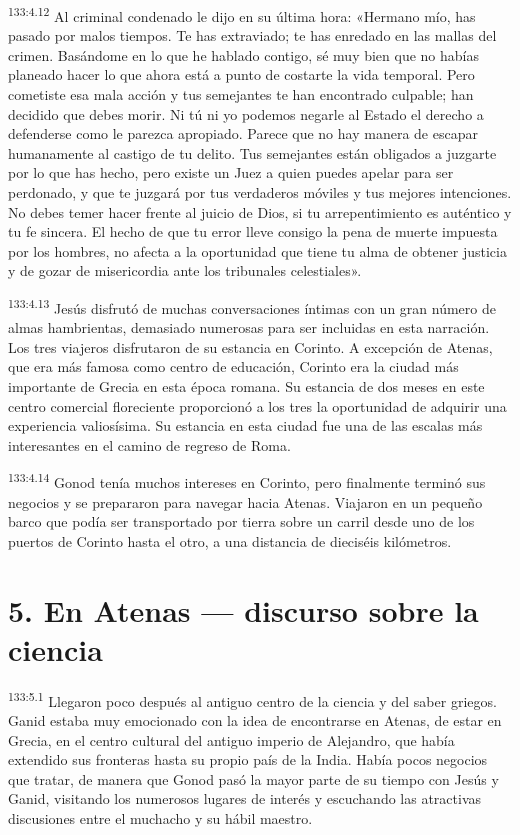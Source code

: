\par
\textsuperscript{133:4.12} Al criminal condenado le dijo en su última hora: «Hermano mío, has pasado por malos tiempos. Te has extraviado; te has enredado en las mallas del crimen. Basándome en lo que he hablado contigo, sé muy bien que no habías planeado hacer lo que ahora está a punto de costarte la vida temporal. Pero cometiste esa mala acción y tus semejantes te han encontrado culpable; han decidido que debes morir. Ni tú ni yo podemos negarle al Estado el derecho a defenderse como le parezca apropiado. Parece que no hay manera de escapar humanamente al castigo de tu delito. Tus semejantes están obligados a juzgarte por lo que has hecho, pero existe un Juez a quien puedes apelar para ser perdonado, y que te juzgará por tus verdaderos móviles y tus mejores intenciones. No debes temer hacer frente al juicio de Dios, si tu arrepentimiento es auténtico y tu fe sincera. El hecho de que tu error lleve consigo la pena de muerte impuesta por los hombres, no afecta a la oportunidad que tiene tu alma de obtener justicia y de gozar de misericordia ante los tribunales celestiales».

\par
\textsuperscript{133:4.13} Jesús disfrutó de muchas conversaciones íntimas con un gran número de almas hambrientas, demasiado numerosas para ser incluidas en esta narración. Los tres viajeros disfrutaron de su estancia en Corinto. A excepción de Atenas, que era más famosa como centro de educación, Corinto era la ciudad más importante de Grecia en esta época romana. Su estancia de dos meses en este centro comercial floreciente proporcionó a los tres la oportunidad de adquirir una experiencia valiosísima. Su estancia en esta ciudad fue una de las escalas más interesantes en el camino de regreso de Roma.

\par
\textsuperscript{133:4.14} Gonod tenía muchos intereses en Corinto, pero finalmente terminó sus negocios y se prepararon para navegar hacia Atenas. Viajaron en un pequeño barco que podía ser transportado por tierra sobre un carril desde uno de los puertos de Corinto hasta el otro, a una distancia de dieciséis kilómetros.

\section*{5. En Atenas --- discurso sobre la ciencia}
\par
\textsuperscript{133:5.1} Llegaron poco después al antiguo centro de la ciencia y del saber griegos. Ganid estaba muy emocionado con la idea de encontrarse en Atenas, de estar en Grecia, en el centro cultural del antiguo imperio de Alejandro, que había extendido sus fronteras hasta su propio país de la India. Había pocos negocios que tratar, de manera que Gonod pasó la mayor parte de su tiempo con Jesús y Ganid, visitando los numerosos lugares de interés y escuchando las atractivas discusiones entre el muchacho y su hábil maestro.

